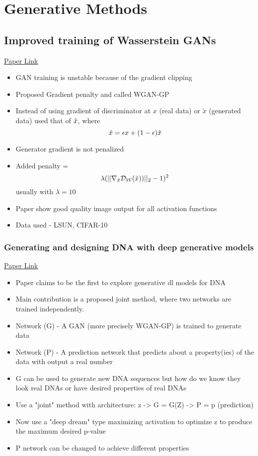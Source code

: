 \documentclass[11pt]{article}
\begin{document}
    \section{Generative Methods}

    \subsection{Improved training of Wasserstein GANs}
    \href{https://arxiv.org/pdf/1704.00028.pdf}{Paper Link}
    \begin{itemize}
        \item GAN training is unstable because of the gradient clipping
        \item Proposed Gradient penalty and called WGAN-GP
        \item Instead of using gradient of discriminator at $x$ (real data) or $\tilde{x}$ (generated data) used that of $\hat{x}$, where $$\hat{x} = \epsilon x + (1-\epsilon) \tilde{x}$$ 
        \item Generator gradient is not penalized 
        \item Added penalty = $$\lambda (||\nabla_{\hat{x}} \mathcal{D_W} (\hat{x}))||_2 - 1)^2$$ usually with $\lambda=10$
        \item Paper show good quality image output for all activation functions
        \item Data used - LSUN, CIFAR-10
    \end{itemize}

    \subsubsection{Generating and designing DNA with deep generative models}
    \href{https://arxiv.org/pdf/1712.06148.pdf}{Paper Link}
    \begin{itemize}
        \item Paper claims to be the first to explore generative dl models for DNA
        \item Main contribution is a proposed joint method, where two networks are trained independently.
        \item Network (G) - A GAN (more precisely WGAN-GP) is trained to generate data
        \item Network (P) - A prediction network that predicts about a property(ies) of the data with output a real number
        \item G can be used to generate new DNA sequences but how do we know they look real DNAs or have desired properties of real DNAs
        \item Use a "joint" method with architecture: z -> G = G(Z) -> P = p (prediction)
        \item Now use a "deep dream" type maximizing activation to optimize z to produce the maximum desired p-value
        \item P network can be changed to achieve different properties
    \end{itemize}
\end{document}
